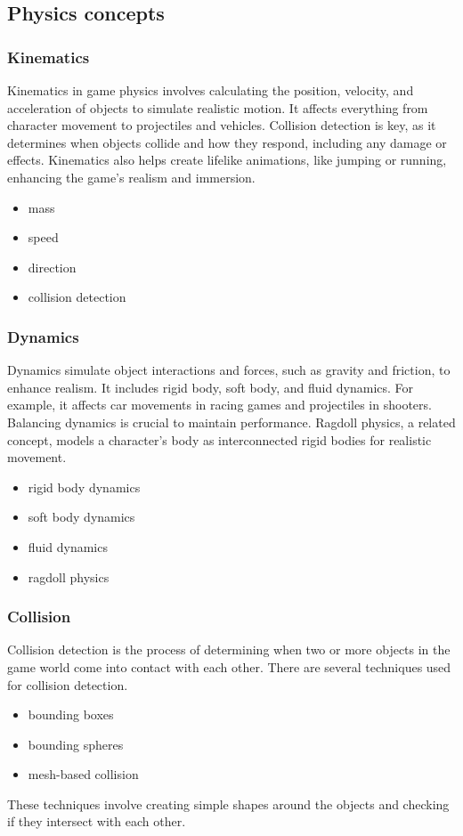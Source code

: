 \documentclass{projdoc}
\begin{document}
\subsection{Physics concepts}




\subsubsection{Kinematics}
Kinematics in game physics involves calculating the position, velocity, and acceleration of objects to simulate realistic motion. It affects everything from character movement to projectiles and vehicles. Collision detection is key, as it determines when objects collide and how they respond, including any damage or effects. Kinematics also helps create lifelike animations, like jumping or running, enhancing the game's realism and immersion.
\begin{itemize}
	\item mass
	\item speed
	\item direction
	\item collision detection
\end{itemize}


\subsubsection{Dynamics}
Dynamics simulate object interactions and forces, such as gravity and friction, to enhance realism. It includes rigid body, soft body, and fluid dynamics. For example, it affects car movements in racing games and projectiles in shooters. Balancing dynamics is crucial to maintain performance. Ragdoll physics, a related concept, models a character’s body as interconnected rigid bodies for realistic movement.
\begin{itemize}
	\item rigid body dynamics
	\item soft body dynamics
	\item fluid dynamics
	\item ragdoll physics
\end{itemize}


\subsubsection{Collision}
Collision detection is the process of determining when two or more objects in the game world come into contact with each other. There are several techniques used for collision detection.
\begin{itemize}
	\item bounding boxes
	\item bounding spheres
	\item mesh-based collision
\end{itemize}
These techniques involve creating simple shapes around the objects and checking if they intersect with each other.
\end{document}
